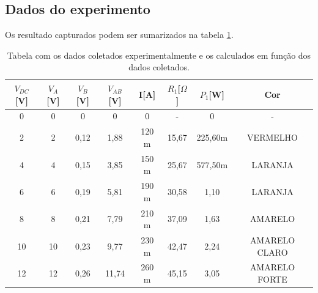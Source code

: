 \documentclass[12pt]{IEEEtran}
\begin{document}
\subsection{Dados do experimento}


Os resultado capturados podem ser sumarizados na tabela \ref{tab:data_table}.


\begin{table}[t]
\centering
\caption{Tabela com os dados coletados experimentalmente e os calculados em função dos dados coletados.}
\label{tab:data_table}
\begin{tabular}{|c|c|c|c|c|c|c|c|}
\hline
\textbf{$V_{DC}${[}V{]}} & \textbf{$V_A${[}V{]}} & \textbf{$V_B${[}V{]}} & \textbf{$V_{AB}${[}V{]}} & \textbf{I{[}A{]}} & \textbf{$R_1${[}$\Omega${]}} & \textbf{$P_1${[}W{]}} & \textbf{Cor}  \\ \hline
0                        & 0                     & 0                     & 0                        & 0                 & -                            & 0                     & -             \\ \hline
2                        & 2                     & 0,12                  & 1,88                     & 120 m             & 15,67                        & 225,60m               & VERMELHO      \\ \hline
4                        & 4                     & 0,15                  & 3,85                     & 150 m             & 25,67                        & 577,50m               & LARANJA       \\ \hline
6                        & 6                     & 0,19                  & 5,81                     & 190 m             & 30,58                        & 1,10                  & LARANJA       \\ \hline
8                        & 8                     & 0,21                  & 7,79                     & 210 m             & 37,09                        & 1,63                  & AMARELO       \\ \hline
10                       & 10                    & 0,23                  & 9,77                     & 230 m             & 42,47                        & 2,24                  & AMARELO CLARO \\ \hline
12                       & 12                    & 0,26                  & 11,74                    & 260 m             & 45,15                        & 3,05                  & AMARELO FORTE \\ \hline
\end{tabular}
\end{table}
\end{document}
